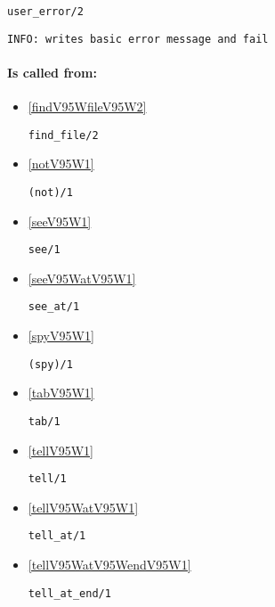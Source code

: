 \begin{verbatim}
user_error/2
\end{verbatim}

{\small \begin{verbatim}
INFO: writes basic error message and fail

\end{verbatim}}
\paragraph{Is called from:} 
\begin{itemize}
\item \ref{findV95WfileV95W2} 
\begin{verbatim}
find_file/2
\end{verbatim}

\item \ref{notV95W1} 
\begin{verbatim}
(not)/1
\end{verbatim}

\item \ref{seeV95W1} 
\begin{verbatim}
see/1
\end{verbatim}

\item \ref{seeV95WatV95W1} 
\begin{verbatim}
see_at/1
\end{verbatim}

\item \ref{spyV95W1} 
\begin{verbatim}
(spy)/1
\end{verbatim}

\item \ref{tabV95W1} 
\begin{verbatim}
tab/1
\end{verbatim}

\item \ref{tellV95W1} 
\begin{verbatim}
tell/1
\end{verbatim}

\item \ref{tellV95WatV95W1} 
\begin{verbatim}
tell_at/1
\end{verbatim}

\item \ref{tellV95WatV95WendV95W1} 
\begin{verbatim}
tell_at_end/1
\end{verbatim}

\end{itemize}

